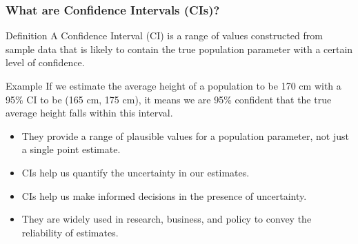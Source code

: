 \documentclass[notes,10pt, aspectratio=169]{beamer}
\begin{document}
\begin{frame}
    \frametitle{What are Confidence Intervals (CIs)?}
    
    \begin{exampleblock}{Definition}
        A Confidence Interval (CI) is a range of values constructed from sample data that is likely to contain the true population parameter with a certain level of confidence.
    \end{exampleblock}
    
    \begin{block}{Example}
        If we estimate the average height of a population to be 170 cm with a 95\% CI to be (165 cm, 175 cm), it means we are 95\% confident that the true average height falls within this interval.
    \end{block}
    \begin{itemize}
        \item They provide a range of plausible values for a population parameter, not just a single point estimate.
        \item CIs help us quantify the uncertainty in our estimates.
        \item CIs help us make informed decisions in the presence of uncertainty.
        \item They are widely used in research, business, and policy to convey the reliability of estimates.
    \end{itemize}
    
\end{frame}
\end{document}
